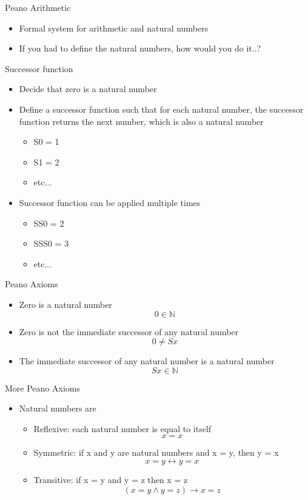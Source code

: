 \documentclass[utf8]{beamer}
\let\iff\leftrightarrow
\let\implies\rightarrow
\begin{document}
\begin{frame}{Peano Arithmetic}
\begin{itemize}
\item Formal system for arithmetic and natural numbers
\item If you had to define the natural numbers, how would you do it..?
\end{itemize}
\end{frame}

\begin{frame}{Successor function}
\begin{itemize}
\item Decide that zero is a natural number
\item Define a successor function such that for each natural number, the successor function returns the next number,
which is also a natural number
\begin{itemize}
\item S0 = 1
\item S1 = 2
\item etc...
\end{itemize}
\item Successor function can be applied multiple times
\begin{itemize}
\item SS0 = 2
\item SSS0 = 3
\item etc...
\end{itemize}
\end{itemize}
\end{frame}

\begin{frame}{Peano Axioms}
\begin{itemize}
\item Zero is a natural number
\[ 0 \in \mathbb{N} \]
\item Zero is not the immediate successor of any natural number
\[ 0 \neq Sx \]
\item The immediate successor of any natural number is a natural number
\[ Sx \in \mathbb{N} \]
\end{itemize}
\end{frame}

\begin{frame}{More Peano Axioms}
\begin{itemize}
\item Natural numbers are
\begin{itemize}
\item Reflexive: each natural number is equal to itself
\[ x = x \]
\item Symmetric: if x and y are natural numbers and x = y, then y = x
\[ x = y \iff y = x \]
\item Transitive: if x = y and y = z then x = z
\[ (x = y \land y = z) \implies x = z \]
\end{itemize}
\end{itemize}
\end{frame}
\end{document}

